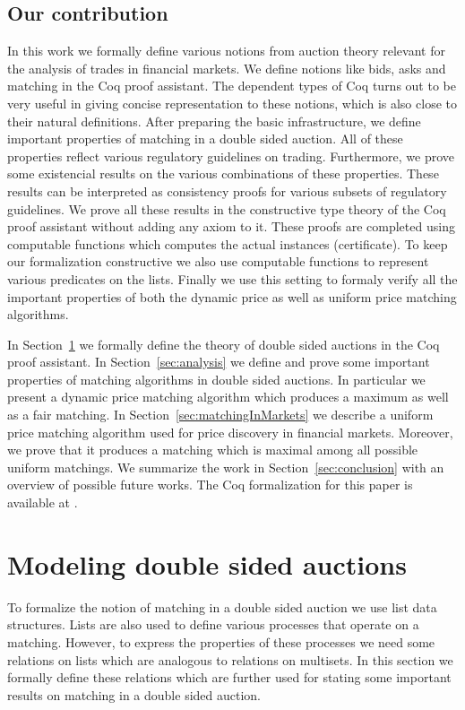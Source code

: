 \documentclass[a4paper,UKenglish,cleveref, autoref]{lipics-v2019}
\begin{document}
\subsection{Our contribution}

In this work we formally define various notions from auction theory relevant for the analysis of trades in financial markets. We define notions like bids, asks and matching in the Coq proof assistant. The dependent types of Coq turns out to be very useful in giving concise representation to these notions, which is also close to their natural definitions. After preparing the basic infrastructure, we define important properties of matching in a double sided auction. All of these properties reflect various regulatory guidelines on trading. Furthermore, we prove some existencial results on the various combinations of these properties. These results can be interpreted as consistency proofs for various subsets of regulatory guidelines. We prove all these results in the constructive type theory of the Coq proof assistant without adding any axiom to it. These proofs are completed using computable functions which computes the actual instances (certificate). To keep our formalization constructive we also use computable functions to represent various predicates on the lists. Finally we use this setting to formaly verify all the important properties of both the dynamic price as well as uniform price matching algorithms. 

In Section~\ref{sec:modeling} we formally define the theory of double sided auctions in the Coq proof assistant. In Section~\ref{sec:analysis} we define and prove some important properties of matching algorithms in double sided auctions. In particular we present a dynamic price matching algorithm which produces a maximum as well as a fair matching. In Section~\ref{sec:matchingInMarkets} we describe a uniform price matching algorithm used for price discovery in financial markets. Moreover, we prove that it produces a matching which is maximal among all possible uniform matchings. We summarize the work in Section~\ref{sec:conclusion} with an overview of possible future works. The Coq formalization for this paper is available at \cite{auctiongithub}.  

\section{Modeling double sided auctions}\label{sec:modeling}

To formalize the notion of matching in a double sided auction we use  list data structures.  Lists are also used to define various processes that operate on  a matching. However, to express the properties of these processes we need some  relations on lists which are analogous to  relations on multisets. In this section we formally define these relations which are further used for stating some important results on matching in a double sided auction.
\end{document}
